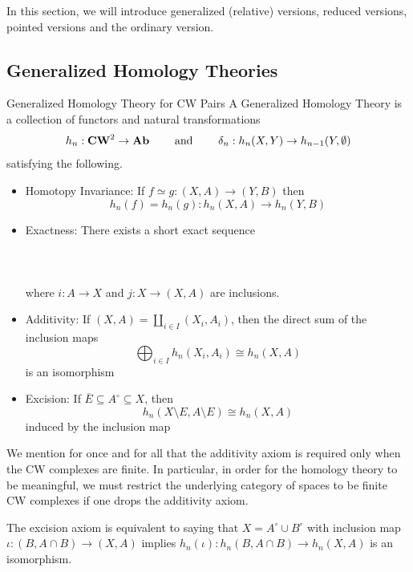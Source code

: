 \documentclass[a4paper]{article}
\begin{document}
In this section, we will introduce generalized (relative) versions, reduced versions, pointed versions and the ordinary version. 

\subsection{Generalized Homology Theories}
\begin{defn}{Generalized Homology Theory for CW Pairs}{} A Generalized Homology Theory is a collection of functors and natural transformations $$h_n:\bold{CW}^2\to\bold{Ab}\;\;\;\;\;\;\;\text{ and }\;\;\;\;\;\;\;\delta_n:h_n(X,Y)\to h_{n-1}(Y,\emptyset)$$ satisfying the following. 
\begin{itemize}
\item Homotopy Invariance: If $f\simeq g:(X,A)\to(Y,B)$ then $$h_n(f)=h_n(g):h_n(X,A)\to h_n(Y,B)$$
\item Exactness: There exists a short exact sequence \\~\\
\\~\\
where $i:A\to X$ and $j:X\to(X,A)$ are inclusions. 
\item Additivity: If $(X,A)=\coprod_{i\in I}(X_i,A_i)$, then the direct sum of the inclusion maps $$\bigoplus_{i\in I}h_n(X_i,A_i)\cong h_n(X,A)$$ is an isomorphism
\item Excision: If $\overline{E}\subseteq A^\circ\subseteq X$, then $$h_n(X\setminus E,A\setminus E)\cong h_n(X,A)$$ induced by the inclusion map
\end{itemize}
\end{defn}

We mention for once and for all that the additivity axiom is required only when the CW complexes are finite. In particular, in order for the homology theory to be meaningful, we must restrict the underlying category of spaces to be finite CW complexes if one drops the additivity axiom. 

\begin{lmm}{}{} The excision axiom is equivalent to saying that $X=A^\circ\cup B^\circ$ with inclusion map $\iota:(B,A\cap B)\to (X,A)$ implies $h_n(\iota):h_n(B,A\cap B)\to h_n(X,A)$ is an isomorphism. 
\end{lmm}
\end{document}
